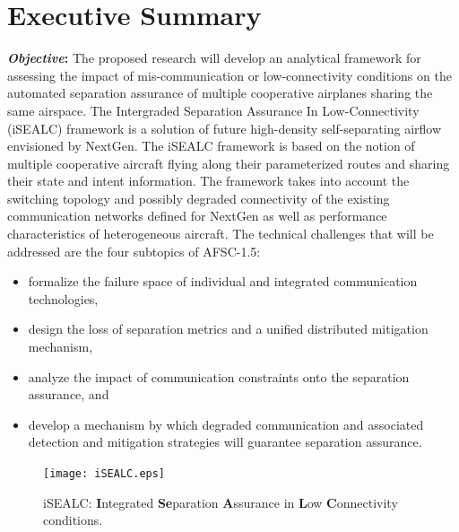 \documentclass[letter,onecolumn,12pt]{aiaa-tc}
\newcommand{\1}{1_n}
\begin{document}
\pagestyle{empty}
\section*{Executive Summary}  %
\textbf{\emph{Objective}:} The proposed research will develop an analytical framework for assessing the impact
of mis-communication or low-connectivity conditions on the automated separation assurance of multiple cooperative
airplanes sharing the same airspace. The Intergraded Separation Assurance In Low-Connectivity (iSEALC) framework
is a solution of future high-density self-separating airflow envisioned by NextGen. The iSEALC framework is based on
the notion of  multiple cooperative aircraft flying along their parameterized routes and sharing their state
and intent information. The framework takes into account the switching topology and possibly degraded connectivity
of the existing communication networks defined for NextGen as well as performance characteristics of heterogeneous aircraft.
The technical challenges that will be addressed are the four subtopics of AFSC-1.5:
\vspace{-4mm}
\begin{itemize}
\setlength{\itemsep}{-4pt}
    \item formalize the failure space of individual and integrated communication technologies,
    \item design the loss of separation metrics and a unified distributed mitigation mechanism,
    \item analyze the impact of  communication constraints onto the separation assurance, and
    \item develop a mechanism by which degraded communication and associated detection and mitigation strategies will guarantee separation assurance.
\end{itemize}
\vspace{-2mm}
\begin{figure}
\centering
\vspace{-0mm}
\texttt{[image: iSEALC.eps]}
\caption*{\footnotesize iSEALC: \textbf{I}ntegrated \textbf{Se}paration \textbf{A}ssurance in \textbf{L}ow \textbf{C}onnectivity conditions.}
\label{fig:ISEALC}
\end{figure}
\vspace{-1mm}
\end{document}
